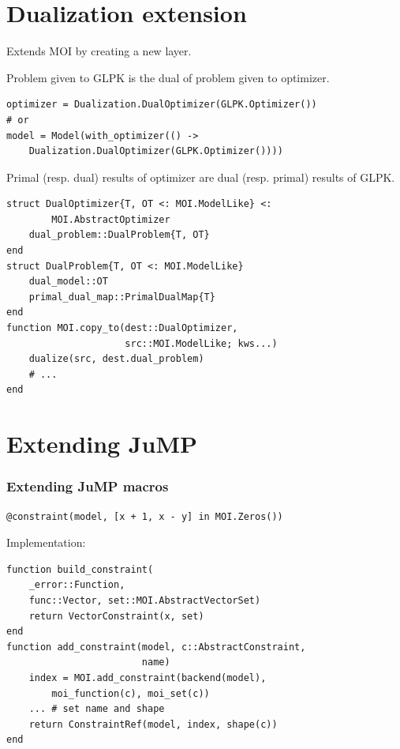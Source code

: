 \documentclass{beamer}
\begin{document}
\section{Dualization extension}

\begin{frame}[fragile]
  Extends MOI by creating a new \alert{layer}.

  Problem given to GLPK is the \alert{dual} of problem given to optimizer.
\begin{verbatim}
optimizer = Dualization.DualOptimizer(GLPK.Optimizer())
# or
model = Model(with_optimizer(() ->
    Dualization.DualOptimizer(GLPK.Optimizer())))
\end{verbatim}
  Primal (resp. dual) results of optimizer are dual (resp. primal) results of GLPK.
\end{frame}

\begin{frame}[fragile]
\begin{verbatim}
struct DualOptimizer{T, OT <: MOI.ModelLike} <:
        MOI.AbstractOptimizer
    dual_problem::DualProblem{T, OT}
end
struct DualProblem{T, OT <: MOI.ModelLike}
    dual_model::OT
    primal_dual_map::PrimalDualMap{T}
end
function MOI.copy_to(dest::DualOptimizer,
                     src::MOI.ModelLike; kws...)
    dualize(src, dest.dual_problem)
    # ...
end
\end{verbatim}
\end{frame}

\section{Extending JuMP}

\begin{frame}[fragile]
  \frametitle{Extending JuMP macros}
\begin{verbatim}
@constraint(model, [x + 1, x - y] in MOI.Zeros())
\end{verbatim}
  Implementation:
\begin{verbatim}
function build_constraint(
    _error::Function,
    func::Vector, set::MOI.AbstractVectorSet)
    return VectorConstraint(x, set)
end
function add_constraint(model, c::AbstractConstraint,
                        name)
    index = MOI.add_constraint(backend(model),
        moi_function(c), moi_set(c))
    ... # set name and shape
    return ConstraintRef(model, index, shape(c))
end
\end{verbatim}
\end{frame}
\end{document}
